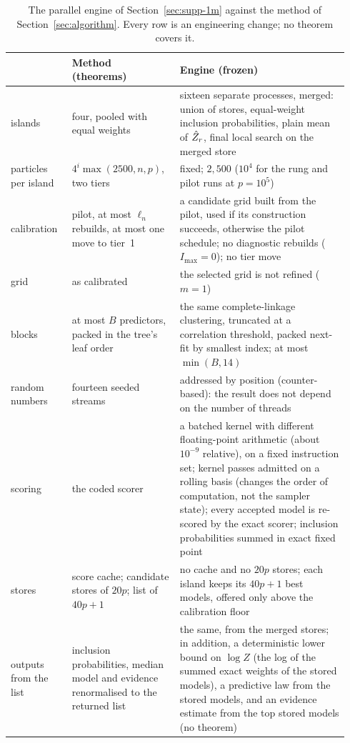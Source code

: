 \begin{table}[ht]
\centering\small
\caption{The parallel engine of Section~\ref{sec:supp-1m} against the method of Section~\ref{sec:algorithm}. Every row is an engineering change; no
theorem covers it.}\label{tab:engine}
\begin{tabular}{@{}>{\raggedright\arraybackslash}p{0.17\linewidth}>{\raggedright\arraybackslash}p{0.3\linewidth}>{\raggedright\arraybackslash}p{0.47\linewidth}@{}}
\toprule
 & Method (theorems) & Engine (frozen) \\
\midrule
islands & four, pooled with equal weights & sixteen separate processes, merged: union of stores, equal-weight inclusion
probabilities, plain mean of $\hat Z_r$, final local search on the merged store \\
particles per island & $4^i\max(2500,n,p)$, two tiers & fixed; $2{,}500$ ($10^4$ for the rung and pilot runs at
$p=10^5$) \\
calibration & pilot, at most $\ell_n$ rebuilds, at most one move to tier~1 & a candidate grid built from the pilot, used if its construction succeeds, otherwise the pilot schedule; no diagnostic
rebuilds ($I_{\max}=0$); no tier move \\
grid & as calibrated & the selected grid is not refined ($m=1$) \\
blocks & at most $B$ predictors, packed in the tree's leaf order & the same complete-linkage clustering, truncated at a
correlation threshold, packed next-fit by smallest index; at most $\min(B,14)$ \\
random numbers & fourteen seeded streams & addressed by position (counter-based): the result does not depend on the number
of threads \\
scoring & the coded scorer & a batched kernel with different floating-point arithmetic (about $10^{-9}$ relative), on a fixed
instruction set; kernel passes admitted on a rolling basis (changes the order of computation, not the sampler state);
every accepted model is re-scored by the exact scorer; inclusion probabilities summed in exact fixed point \\
stores & score cache; candidate stores of $20p$; list of $40p+1$ & no cache and no $20p$ stores; each island keeps its
$40p+1$ best models, offered only above the calibration floor \\
outputs from the list & inclusion probabilities, median model and evidence renormalised to the returned list & the same,
from the merged stores; in addition, a deterministic lower bound on $\log Z$ (the log of the summed exact weights of the
stored models), a predictive law from the stored models, and an evidence estimate from the top stored models (no
theorem) \\
\bottomrule
\end{tabular}
\end{table}

